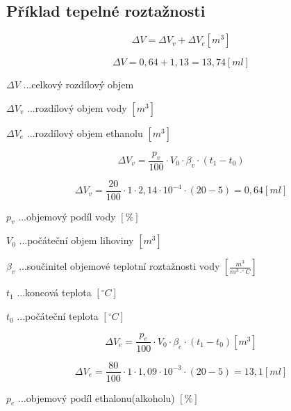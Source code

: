 
\subsection{Příklad tepelné roztažnosti}
\begin{equation}
\label{objem_kapalina}
    \Delta V = \Delta V_v + \Delta V_e \left[m^3\right]
\end{equation}


\[\Delta V = 0,64 + 1,13 = 13,74 \left[ml\right]\]


\(\Delta V\) ...celkový rozdílový objem

\(\Delta V_{v}\) ...rozdílový objem vody \([m^3]\)

\(\Delta V_{e}\) ...rozdílový objem ethanolu \([m^3]\)


\begin{equation}
    \Delta V_v = \frac{p_v}{100} \cdot V_0 \cdot \beta_v \cdot (t_1 - t_0)
\end{equation}

\[\Delta V_v = \frac{20}{100} \cdot 1 \cdot  2,14 \cdot 10^{-4} \cdot (20 - 5) = 0,64 \left[ml\right]\]

\(p_v\) ...objemový podíl vody \([\%]\) 

\(V_0\) ...počáteční objem lihoviny \([m^3]\)

\(\beta_v\) ...součinitel objemové teplotní roztažnosti vody \([\frac{m^3}{m^3 \cdot ^\circ C}]\)

\(t_1\) ...koncová teplota \([^\circ C]\)

\(t_0\) ...počáteční teplota \([^\circ C]\)

\begin{equation}
    \Delta V_e = \frac{p_e}{100} \cdot V_0 \cdot \beta_e \cdot (t_1 - t_0)\left[m^3\right] \label{objem_kapalina}
\end{equation}

\[\Delta V_e = \frac{80}{100} \cdot 1 \cdot  1,09 \cdot 10^{-3} \cdot (20 - 5) = 13,1 \left[ml\right]\]

\(p_e\) ...objemový podíl ethalonu(alkoholu) \([\%]\) 

